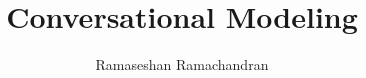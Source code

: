 


\title{Conversational Modeling}
\author[]{Ramaseshan Ramachandran}
\date{}
	\maketitle
	
	
%	
%    
%    
%    

%    
